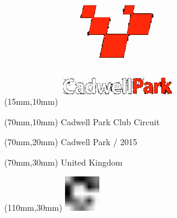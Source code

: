 \null\newpage
\begin{textblock*}{50mm}(15mm,10mm)%
\includegraphics[width=50mm]{LG/CAD.png}
\end{textblock*}
\begin{textblock*}{130mm}(70mm,10mm)%
{\fontsize{20}{20}\selectfont Cadwell Park Club Circuit}\\
\end{textblock*}
\begin{textblock*}{120mm}(70mm,20mm)%
{\fontsize{16}{16}\selectfont Cadwell Park / 2015}\\
\end{textblock*}
\begin{textblock*}{120mm}(70mm,30mm)%
{\fontsize{12}{12}\selectfont United Kingdom}
\end{textblock*}
\begin{textblock*}{30mm}(110mm,30mm)%
\centering
\includegraphics[height=15mm]{icons/fa-rotate-right.pdf}
\end{textblock*}
